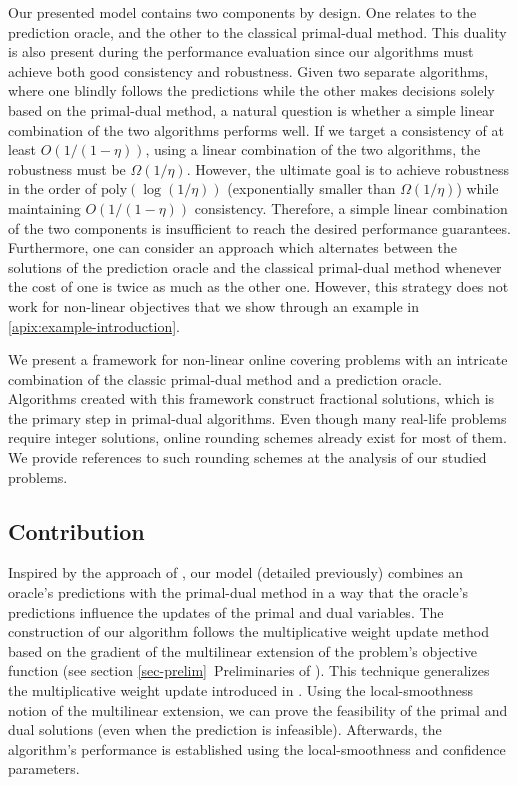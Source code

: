 Our presented model contains two components by design. One relates to the prediction oracle, and the other to the classical primal-dual method. This duality is also present during the performance evaluation since our algorithms must achieve both good consistency and robustness. Given two separate algorithms, where one blindly follows the predictions while the other makes decisions solely based on the primal-dual method, a natural question is whether a simple linear combination of the two algorithms performs well. If we target a consistency of at least $O(1/(1-\eta))$, using a linear combination of the two algorithms, the robustness must be $\Omega(1/\eta)$. However, the ultimate goal is to achieve robustness in the order of $\text{poly}(\log(1/\eta))$ (exponentially smaller than $\Omega(1/\eta)$) while maintaining $O(1/(1-\eta))$ consistency. Therefore, a simple linear combination of the two components is insufficient to reach the desired performance guarantees. Furthermore, one can consider an approach which alternates between the solutions of the prediction oracle and the classical primal-dual method whenever the cost of one is twice as much as the other one. However, this strategy does not work for non-linear objectives that we show through an example in \cref{apix:example-introduction}.

We present a framework for non-linear online covering problems with an intricate combination of the classic primal-dual method and a prediction oracle. Algorithms created with this framework construct fractional solutions, which is the primary step in primal-dual algorithms. Even though many real-life problems require integer solutions, online rounding schemes already exist for most of them. We provide references to such rounding schemes at the analysis of our studied problems.


\subsection{Contribution}  \label{sec:intro-covering}

Inspired by the approach of \cite{BamasMaggiori20:The-Primal-Dual-method}, our model (detailed previously) combines an oracle's predictions with the primal-dual method in a way that the oracle's predictions influence the updates of the primal and dual variables. The construction of our algorithm follows the multiplicative weight update method based on the gradient of the multilinear extension of the problem's objective function (see section \ref{sec-prelim}~Preliminaries of \cite{Thang20:Online-Primal-Dual}). This technique generalizes the multiplicative weight update introduced in \cite{BuchbinderNaor09:The-Design-of-Competitive,AzarBuchbinder16:Online-Algorithms}. Using the local-smoothness notion of the multilinear extension, we can prove the feasibility of the primal and dual solutions (even when the prediction is infeasible). Afterwards, the algorithm's performance is established using the local-smoothness and confidence parameters.


